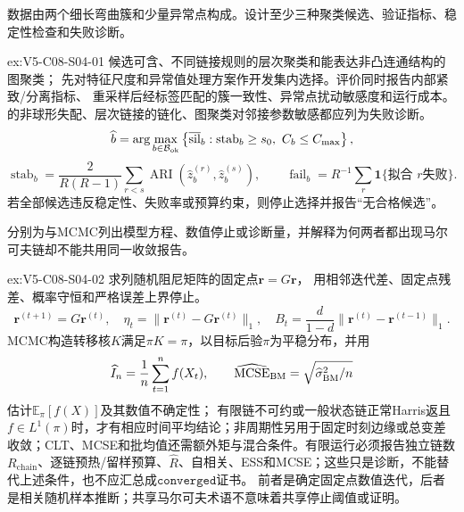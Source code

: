 \begin{SLChapterExercisePairSection}
\begin{exercise}\label{ex:V5-C08-S04-01}
数据由两个细长弯曲簇和少量异常点构成。设计至少三种聚类候选、验证指标、稳定性检查和失败诊断。
\end{exercise}
\label{sol:V5-C08-S04-01}
\begin{chapterexercisesolution}{ex:V5-C08-S04-01}
候选可含\kMeans{}、不同链接规则的层次聚类和能表达非凸连通结构的图聚类；
先对特征尺度和异常值处理方案作开发集内选择。评价同时报告内部紧致/分离指标、
重采样后经标签匹配的簇一致性、异常点扰动敏感度和运行成本。
\kMeans{}的非球形失配、层次链接的链化、图聚类对邻接参数敏感都应列为失败诊断。
\[
\widehat b=\arg\max_{b\in\mathcal B_{\rm ok}}
\left\{\overline{\operatorname{sil}}_b:
\operatorname{stab}_b\ge s_0,\ C_b\le C_{\max}\right\},
\]
\[
\operatorname{stab}_b
=\frac{2}{R(R-1)}\sum_{r<s}
\operatorname{ARI}(\widehat z_b^{(r)},\widehat z_b^{(s)}),
\qquad
\operatorname{fail}_b=R^{-1}\sum_r\boldsymbol1\{\text{拟合 }r\text{失败}\}.
\]
若全部候选违反稳定性、失败率或预算约束，则停止选择并报告“无合格候选”。
\end{chapterexercisesolution}

\begin{exercise}\label{ex:V5-C08-S04-02}
分别为\PageRank{}与MCMC列出模型方程、数值停止或诊断量，并解释为何两者都出现马尔可夫链却不能共用同一收敛报告。
\end{exercise}
\label{sol:V5-C08-S04-02}
\begin{chapterexercisesolution}{ex:V5-C08-S04-02}
\PageRank{}求列随机阻尼矩阵的固定点$\boldsymbol r=G\boldsymbol r$，
用相邻迭代差、固定点残差、概率守恒和严格误差上界停止。
\[
\boldsymbol r^{(t+1)}=G\boldsymbol r^{(t)},\quad
\eta_t=\|\boldsymbol r^{(t)}-G\boldsymbol r^{(t)}\|_1,\quad
B_t=\frac{d}{1-d}\|\boldsymbol r^{(t)}-\boldsymbol r^{(t-1)}\|_1.
\]
MCMC构造转移核$K$满足$\pi K=\pi$，以目标后验$\pi$为平稳分布，并用
\[
\widehat I_n=\frac1n\sum_{t=1}^{n}f(X_t),\qquad
\widehat{\operatorname{MCSE}}_{\rm BM}
=\sqrt{\widehat\sigma_{\rm BM}^2/n}
\]
估计$\mathbb E_\pi[f(X)]$及其数值不确定性；
有限链不可约或一般状态链正常Harris返且$f\in L^1(\pi)$时，才有相应时间平均结论；非周期性另用于固定时刻边缘或总变差收敛；CLT、MCSE和批均值还需额外矩与混合条件。有限运行必须报告独立链数$R_{\mathrm{chain}}$、逐链预热/留样预算、$\widehat R$、自相关、ESS和MCSE；这些只是诊断，不能替代上述条件，也不应汇总成$\mathtt{converged}$证书。
前者是确定固定点数值迭代，后者是相关随机样本推断；共享马尔可夫术语不意味着共享停止阈值或证明。
\end{chapterexercisesolution}


\end{SLChapterExercisePairSection}
